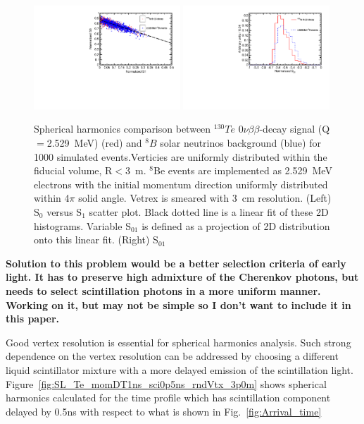 \documentclass[12pt,twoside,letterpaper]{article}
\newcommand{\vbb}{0\nu\beta\beta}
\newcommand{\Te}{^{130}Te}
\newcommand{\B}{^{8}B}
\begin{document}
\begin{figure}[htb]
\centering
\includegraphics[angle=0,width=0.49\textwidth]{plots/hS0vsS1_Te130_1el_allLight_VtxSmear3cm_VtxShiftX0cm_momDT1p0ns_rndVtx_3p0mSphere.pdf}
\includegraphics[angle=0,width=0.49\textwidth]{plots/hS01_allLight_VtxSmear3cm_VtxShiftX0cm_momDT1p0ns_rndVtx_3p0mSphere.pdf}
\caption{Spherical harmonics comparison between $\Te$ $\vbb$-decay signal (Q$=$2.529~MeV) (red) and $\B$ solar neutrinos background (blue) for 1000 simulated events.Verticies are uniformly distributed within the fiducial volume, R$<$3~m. $^8$Be events are implemented as 2.529~MeV electrons with the initial momentum direction uniformly distributed within 4$\pi$ solid angle. Vetrex is smeared with 3~cm resolution. (Left) S$_0$ versus S$_1$ scatter plot. Black dotted line is a linear fit of these 2D histograms. Variable S$_{01}$ is defined as a projection of 2D distribution onto this linear fit. (Right) S$_{01}$}
\label{fig:SL_Te_SmearX3cm_momDT1ns_rndVtx_3p0m}
\end{figure}


{\bf Solution to this problem would be a better selection criteria of early light. It has to preserve high admixture of the Cherenkov photons, but needs to select scintillation photons in a more uniform manner. Working on it, but may not be simple so I don't want to include it in this paper.}

Good vertex resolution is essential for spherical harmonics analysis. Such strong dependence on the vertex resolution can be addressed by choosing a different liquid scintillator mixture with a more delayed emission of the scintillation  light. Figure~\ref{fig:SL_Te_momDT1ns_sci0p5ns_rndVtx_3p0m} shows spherical harmonics calculated for the time profile which has scintillation component delayed by 0.5ns with respect to what is shown in Fig.~\ref{fig:Arrival_time}
\end{document}
